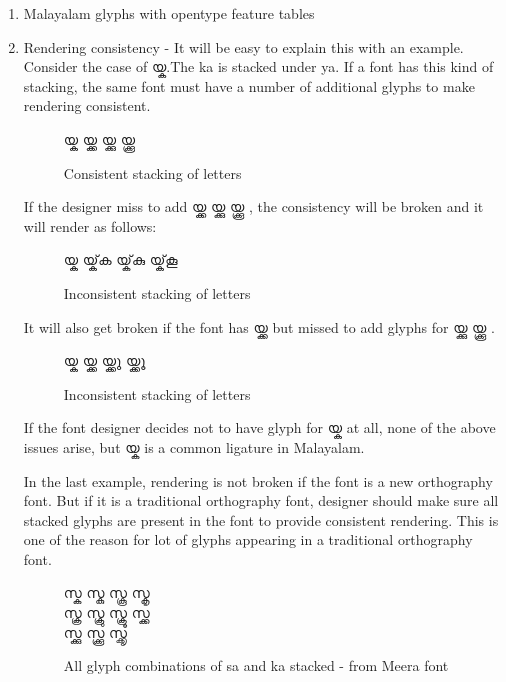 \begin{enumerate}
\item Malayalam glyphs with opentype feature tables
\item Rendering consistency - It will be easy to explain this with an example.
Consider the case of {\malayalam യ്ക}.The ka is stacked under ya. If a font has
this kind of stacking, the same font must have a number of additional glyphs to
make rendering consistent.
\begin{figure}[h!]
  \centering
  {\meera\textexample യ്ക യ്ക്ക യ്ക്കു യ്ക്കൂ }\\
  \caption{Consistent stacking of letters}
\end{figure}

If the designer miss to add {\meera യ്ക്ക യ്ക്കു യ്ക്കൂ }, the consistency will
be broken and it will render as follows:
\begin{figure}[h]
  \centering
  {\meera\textexample യ്ക യ്ക്‌ക യ്ക്‌കു യ്ക്‌കൂ }\\
  \caption{Inconsistent stacking of letters}
\end{figure}

It will also get broken if the font has  {\meera യ്ക്ക} but missed to add
glyphs for {\meera യ്ക്കു യ്ക്കൂ }.

\begin{figure}[h]
  \centering
  {\meera\textexample യ്ക യ്ക്ക യ്ക്ക‌ു യ്ക്ക‌ൂ }\\
  \caption{Inconsistent stacking of letters}
\end{figure}

If the font designer decides not to have glyph for {\meera യ്ക } at  all, none
of the above issues arise, but  {\meera യ്ക } is a common ligature in Malayalam.

In the last example, rendering is not broken if the font is a new orthography
font. But if it is a traditional orthography font, designer should make sure all
stacked glyphs are present in the font to provide consistent rendering. This is
one of the reason for lot of glyphs appearing in a traditional orthography font.

\begin{figure}[h]
  \centering
  {\meera\textexample സ്ക സ്കു സ്കൂ സ്കൃ \\ സ്ക്ര സ്ക്രു സ്ക്രൂ സ്ക്ക \\ സ്ക്കു സ്ക്കൂ സ്ക്കൃ }\\
  \caption{All glyph combinations of sa and ka stacked - from Meera font}
\end{figure}

\end{enumerate}

